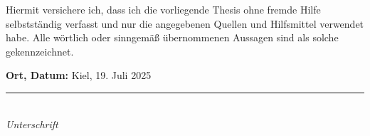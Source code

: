 
Hiermit versichere ich, dass ich die vorliegende Thesis ohne fremde Hilfe selbstständig verfasst und nur die angegebenen Quellen und Hilfsmittel verwendet habe. Alle wörtlich oder sinngemäß übernommenen Aussagen sind als solche gekennzeichnet.

\vspace{3cm}

\noindent
\textbf{Ort, Datum:} \hspace{0.5cm} Kiel, 19. Juli 2025

\vspace{2cm}

\noindent
\rule{6cm}{0.4pt} \\ %
\noindent
\textit{Unterschrift}

